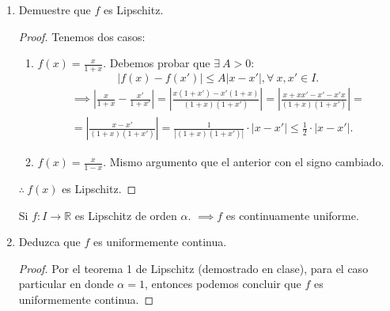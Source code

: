\begin{enumerate}
\begin{proof}
\begin{enumerate}
\begin{enumerate}
\begin{align*}
				\end{align*} 
			Entonces: 
			$$ \frac{1}{|(x+1)(x_0+1)|}\cdot |x-x_0|\leq \frac{1}{2}|x-x_0|<\varepsilon.$$
			$$\implies |x-x_0|<2\varepsilon.$$
				Por lo cual, seleccionamos arbitrariamente $\delta := \min\left\{2\varepsilon, 0\right\}$.
				\item $f(x)= \frac{x}{1+x}$. Mismo argumento del inciso anterior con los signos cambiados. 
			\end{enumerate}
			Por lo tanto, la inversa de $f$ es continua.
		\end{enumerate}
		
		$\therefore \ f$ es un homeomorfismo.
	\end{proof}
	\item  Demuestre que $f$ es Lipschitz.
		\begin{proof}
		Tenemos dos casos:
		\begin{enumerate}
			\item $f(x)=\frac{x}{1+x}$. Debemos probar que $\exists \ A>0$: 
			$$|f(x)-f(x')|\leq A|x-x'|, \forall \ x,x'\in I.$$
			\begin{align*}
				\implies \left|\frac{x}{1+x}-\frac{x'}{1+x'}\right|=\left|\frac{x(1+x')-x'(1+x)}{(1+x)(1+x')}\right|=\left|\frac{x+xx'-x'-x'x}{(1+x)(1+x')}\right|=\\
				= \left|\frac{x-x'}{(1+x)(1+x')}\right|= \frac{1}{\left|(1+x)(1+x')\right|}\cdot \left|x-x'\right|\leq \frac{1}{2}\cdot \left|x-x'\right|. 
			\end{align*} 
			\item $f(x)=\frac{x}{1-x}$. Mismo argumento que el anterior con el signo cambiado. 
		\end{enumerate}
	$\therefore \ f(x)$ es Lipschitz. 
	\end{proof}
\begin{tcolorbox}[colback=gray!15,colframe=gray!1!gray,title=Teorema 1 de Lipschitz (demostrado en clase)]
	Si $f: I \to \mathbb{R}$ es Lipschitz de orden $\alpha$. $\implies f$ es continuamente uniforme.  
\end{tcolorbox}

	\item  Deduzca que $f$ es uniformemente continua.
		\begin{proof}
		Por el teorema 1 de Lipschitz (demostrado en clase), para el caso particular en donde $\alpha=1$, entonces podemos concluir que $f$ es uniformemente continua.
	\end{proof}
\end{enumerate}
